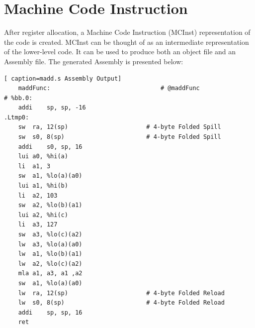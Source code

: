 \section{Machine Code Instruction}
After register allocation, a Machine Code Instruction (MCInst) representation of the code is created. MCInst can be thought of as an intermediate representation of the lower-level code. It can be used to produce both an object file and an Assembly file. The generated Assembly is presented below:
\begin{lstlisting}[ caption=madd.s Assembly Output]
    maddFunc:                               # @maddFunc
# %bb.0:
	addi	sp, sp, -16
.Ltmp0:
	sw	ra, 12(sp)                      # 4-byte Folded Spill
	sw	s0, 8(sp)                       # 4-byte Folded Spill
	addi	s0, sp, 16
	lui	a0, %hi(a)
	li	a1, 3
	sw	a1, %lo(a)(a0)
	lui	a1, %hi(b)
	li	a2, 103
	sw	a2, %lo(b)(a1)
	lui	a2, %hi(c)
	li	a3, 127
	sw	a3, %lo(c)(a2)
	lw	a3, %lo(a)(a0)
	lw	a1, %lo(b)(a1)
	lw	a2, %lo(c)(a2)
	mla	a1, a3, a1 ,a2
	sw	a1, %lo(a)(a0)
	lw	ra, 12(sp)                      # 4-byte Folded Reload
	lw	s0, 8(sp)                       # 4-byte Folded Reload
	addi	sp, sp, 16
	ret
\end{lstlisting}
